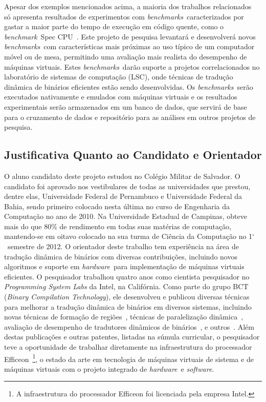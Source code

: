 \documentclass[a4paper,12pt]{article}
\def\degr{${}^\circ$}
\newcommand{\software}{\emph{software}}
\newcommand{\hardware}{\emph{hardware}}
\newcommand{\benchmark}{\emph{benchmark}}
\newcommand{\benchmarks}{\emph{benchmarks}}
\begin{document}
Apesar dos exemplos mencionados acima, a maioria dos trabalhos
relacionados~\cite{Hen00, pin} só apresenta resultados de experimentos com
\benchmarks\ caracterizados por gastar a maior parte do tempo de execução em
código quente, como o \benchmark\ Spec CPU~\cite{Hen00}. Este projeto de
pesquisa levantará e desenvolverá novos \benchmarks\ com características mais
próximas ao uso típico de um computador móvel ou de mesa, permitindo uma
avaliação mais realista do desempenho de máquinas virtuais. Estes
\benchmarks\ darão suporte a projetos correlacionados no laboratório de sistemas
de computação (LSC), onde técnicas de tradução dinâmica de binários eficientes
estão sendo desenvolvidas. Os \benchmarks\ serão executados nativamente e
emulados com máquinas virtuais e os resultados experimentais serão armazenados
em um banco de dados, que servirá de base para o cruzamento de dados e
repositório para as análises em outros projetos de pesquisa.
%
%
\subsection{Justificativa Quanto ao Candidato e Orientador}
\label{subsec:just}
%
O aluno candidato deste projeto estudou no Colégio Militar de Salvador. O
candidato foi aprovado nos vestibulares de todas as universidades que prestou,
dentre elas, Universidade Federal de Pernambuco e Universidade Federal da Bahia,
sendo primeiro colocado nesta última no curso de Engenharia da Computação no ano
de 2010. Na Universidade Estadual de Campinas, obteve mais do que 80\% de
rendimento em todas suas matérias de computação, mantendo-se em oitavo colocado
na sua turma de Ciência da Computação no 1\degr\ semestre de 2012. %
%
O orientador deste trabalho tem experiência na área de tradução dinâmica de
binários com diversas contribuições, incluindo novos algoritmos e suporte em
\hardware\ para implementação de máquinas virtuais eficientes. O pesquisador
trabalhou quatro anos como cientista pesquisador no \emph{Programming System
  Labs} da Intel, na Califórnia. Como parte do grupo BCT (\emph{Binary
  Compilation Technology}), ele desenvolveu e publicou diversas técnicas para
melhorar a tradução dinâmica de binários em diversos sistemas, incluindo novas
técnicas de formação de regiões~\cite{BWBW11,PGW+08,BWW+10}, técnicas de
paralelização dinâmica~\cite{WWB+09}, avaliação de desempenho de tradutores
dinâmicos de binários~\cite{BW08, BW09}, e outros~\cite{WHBW11, BWWA05,
  BWWA06}. Além destas publicações e outras patentes, listadas na súmula
curricular, o pesquisador teve a oportunidade de trabalhar diretamente na
infraestrutura do processador Efficeon~\cite{Kre03}\footnote{A infraestrutura do
  processador Efficeon foi licenciada pela empresa Intel.}, o estado da arte em
tecnologia de máquinas virtuais de sistema e de máquinas virtuais com o projeto
integrado de \hardware\ e \software.
\end{document}
